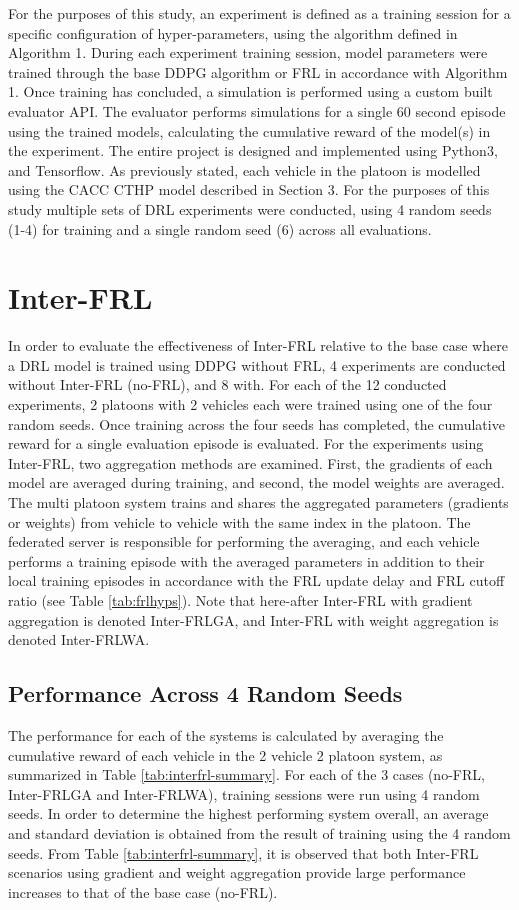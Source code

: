 For the purposes of this study, an experiment is defined as a training session for a
specific configuration of hyper-parameters, using the algorithm defined in Algorithm 1.
During each experiment training session, model parameters were trained through the base
DDPG algorithm or FRL in accordance with Algorithm 1. Once training has concluded, a
simulation is performed using a custom built evaluator API.  The evaluator performs
simulations for a single 60 second episode using the trained models, calculating the
cumulative reward of the model(s) in the experiment.  The entire project is designed and
implemented using Python3, and Tensorflow.  As previously stated, each vehicle in the
platoon is modelled using the CACC CTHP model described in Section 3.  For the purposes
of this study multiple sets of DRL experiments were conducted, using 4 random seeds (1-4)
for training and a single random seed (6) across all evaluations.

\section{Inter-FRL}
In order to evaluate the effectiveness of Inter-FRL relative to the base case where a
DRL model is trained using DDPG without FRL, 4 experiments are conducted without
Inter-FRL (no-FRL), and 8 with.  For each of the 12 conducted experiments, 2 platoons
with 2 vehicles each were trained using one of the four random seeds.  Once training
across the four seeds has completed, the cumulative reward for a single evaluation
episode is evaluated.  For the experiments using Inter-FRL, two aggregation methods
are examined.  First, the gradients of each model are averaged during training, and
second, the model weights are averaged.  The multi platoon system trains and shares
the aggregated parameters (gradients or weights) from vehicle to vehicle with the same
index in the platoon. The federated server is responsible for performing the averaging,
and each vehicle performs a training episode with the averaged parameters in addition
to their local training episodes in accordance with the FRL update delay and FRL
cutoff ratio (see Table \ref{tab:frlhyps}). Note that here-after Inter-FRL with gradient
aggregation is denoted Inter-FRLGA, and Inter-FRL with weight aggregation is denoted
Inter-FRLWA.


\subsection{Performance Across 4 Random Seeds}
The performance for each of the systems is calculated by averaging the cumulative reward
of each vehicle in the 2 vehicle 2 platoon system, as summarized in Table
\ref{tab:interfrl-summary}.  For each of the 3 cases (no-FRL, Inter-FRLGA and Inter-FRLWA),
training sessions were run using 4 random seeds.  In order to determine the highest
performing system overall, an average and standard deviation is obtained from the result
of training using the 4 random seeds. From Table \ref{tab:interfrl-summary}, it is
observed that both Inter-FRL scenarios using gradient and weight aggregation provide
large performance increases to that of the base case (no-FRL).

